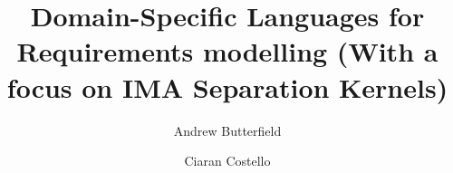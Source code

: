 \documentclass[a4paper, twocolumn]{esapub2005} %
\begin{document}
\title{
  Domain-Specific Languages for Requirements modelling
  \newline
  (With a focus on IMA Separation Kernels)
}

\author{Andrew Butterfield}
\author{Ciaran  Costello}


\date{}

\maketitle

% 




\end{document}
